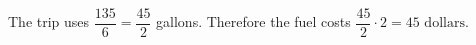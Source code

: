 The trip uses $\dfrac{135}{6}=\dfrac{45}{2}$ gallons. Therefore the fuel costs $\dfrac{45}{2}\cdot2=\boxed{45\text{ dollars}}$.
